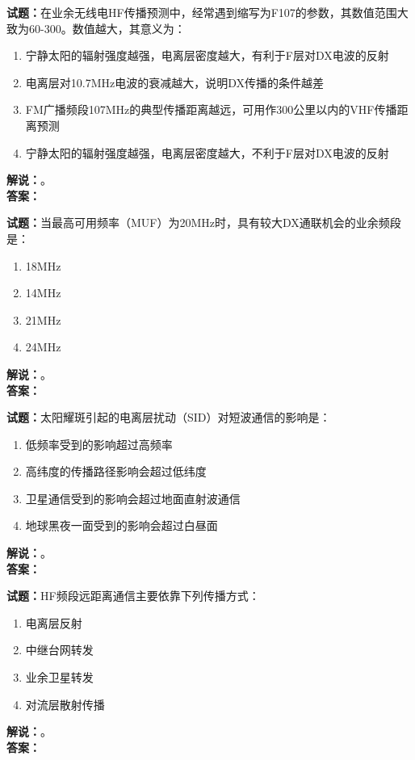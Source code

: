 \documentclass{ctexbook}
\begin{document}
\bigskip




\noindent\textbf{试题：}在业余无线电HF传播预测中，经常遇到缩写为F107的参数，其数值范围大致为60-300。数值越大，其意义为：
\begin{enumerate}[leftmargin=3em]
\item 宁静太阳的辐射强度越强，电离层密度越大，有利于F层对DX电波的反射
\item 电离层对10.7\unit{\MHz}电波的衰减越大，说明DX传播的条件越差
\item FM广播频段107\unit{\MHz}的典型传播距离越远，可用作300公里以内的VHF传播距离预测
\item 宁静太阳的辐射强度越强，电离层密度越大，不利于F层对DX电波的反射
\end{enumerate}
\noindent\textbf{解说：}\textbf{}。\\\noindent\textbf{答案：}

\bigskip




\noindent\textbf{试题：}当最高可用频率（MUF）为20\unit{\MHz}时，具有较大DX通联机会的业余频段是：
\begin{enumerate}[leftmargin=3em]
\item 18\unit{\MHz}
\item 14\unit{\MHz}
\item 21\unit{\MHz}
\item 24\unit{\MHz}
\end{enumerate}
\noindent\textbf{解说：}\textbf{}。\\\noindent\textbf{答案：}

\bigskip




\noindent\textbf{试题：}太阳耀斑引起的电离层扰动（SID）对短波通信的影响是：
\begin{enumerate}[leftmargin=3em]
\item 低频率受到的影响超过高频率
\item 高纬度的传播路径影响会超过低纬度
\item 卫星通信受到的影响会超过地面直射波通信
\item 地球黑夜一面受到的影响会超过白昼面
\end{enumerate}
\noindent\textbf{解说：}\textbf{}。\\\noindent\textbf{答案：}

\bigskip




\noindent\textbf{试题：}HF频段远距离通信主要依靠下列传播方式：
\begin{enumerate}[leftmargin=3em]
\item 电离层反射
\item 中继台网转发
\item 业余卫星转发
\item 对流层散射传播
\end{enumerate}
\noindent\textbf{解说：}\textbf{}。\\\noindent\textbf{答案：}
\end{document}
